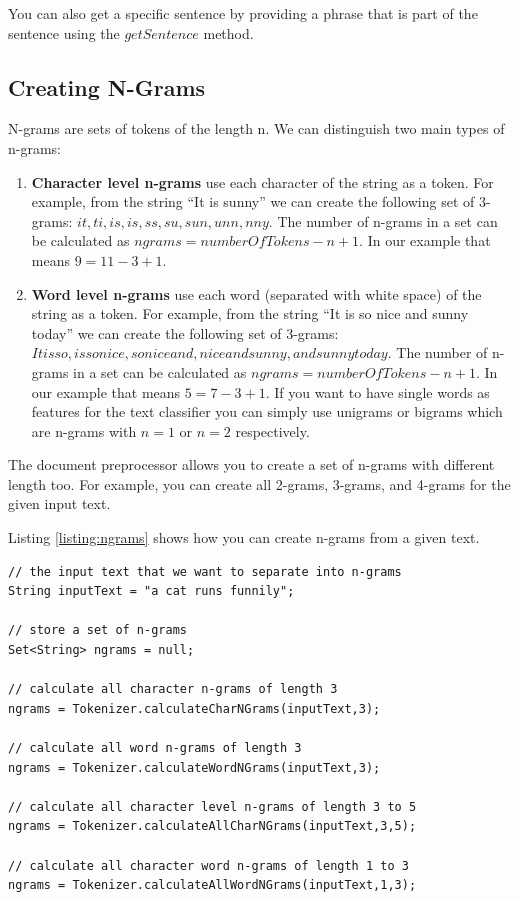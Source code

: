 You can also get a specific sentence by providing a phrase that is part of the sentence using the $getSentence$ method.

\subsection{Creating N-Grams}
\label{sec:ngrams}

N-grams are sets of tokens of the length n. We can distinguish two main types of n-grams:

\begin{enumerate}
\item \textbf{Character level n-grams} use each character of the string as a token. For example, from the string ``It is sunny'' we can create the following set of 3-grams: ${it ,t i, is,is ,s s, su,sun,unn,nny}$. The number of n-grams in a set can be calculated as $ngrams = numberOfTokens - n + 1$. In our example that means $9 = 11 - 3 + 1$.
\item \textbf{Word level n-grams} use each word (separated with white space) of the string as a token. For example, from the string ``It is so nice and sunny today'' we can create the following set of 3-grams: ${It is so,is so nice,so nice and,nice and sunny,and sunny today}$. The number of n-grams in a set can be calculated as $ngrams = numberOfTokens - n + 1$. In our example that means $5 = 7 - 3 + 1$. If you want to have single words as features for the text classifier you can simply use unigrams or bigrams which are n-grams with $n=1$ or $n=2$ respectively.
\end{enumerate}

The document preprocessor allows you to create a set of n-grams with different length too. For example, you can create all 2-grams, 3-grams, and 4-grams for the given input text.

Listing \ref{listing:ngrams} shows how you can create n-grams from a given text.

\begin{codelisting}
\begin{lstlisting}[label=listing:ngrams,caption=Creating n-grams.,frame=tb]
// the input text that we want to separate into n-grams
String inputText = "a cat runs funnily";

// store a set of n-grams
Set<String> ngrams = null;

// calculate all character n-grams of length 3
ngrams = Tokenizer.calculateCharNGrams(inputText,3);

// calculate all word n-grams of length 3
ngrams = Tokenizer.calculateWordNGrams(inputText,3);

// calculate all character level n-grams of length 3 to 5
ngrams = Tokenizer.calculateAllCharNGrams(inputText,3,5);

// calculate all character word n-grams of length 1 to 3
ngrams = Tokenizer.calculateAllWordNGrams(inputText,1,3);
\end{lstlisting}
\end{codelisting}

